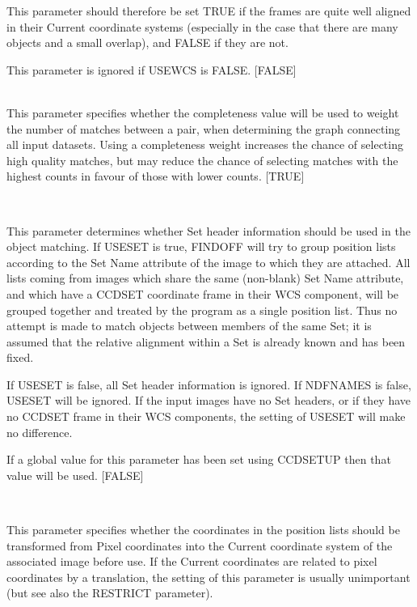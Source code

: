 \documentclass[twoside,11pt]{article}
\renewcommand{\_}{\texttt{\symbol{95}}}
\newcommand{\routine}[1]{{\sc #1}}
\newcommand{\sstsubsection}[1]{ \item[{#1}] \mbox{} \\}
\newcommand{\sstsubsection}[1]{\item[{#1}]}
\begin{document}
{{{         This parameter should therefore be set TRUE if the frames
         are quite well aligned in their Current coordinate systems
         (especially in the case that there are many objects and a
         small overlap), and FALSE if they are not.

         This parameter is ignored if USEWCS is FALSE.
         [FALSE]
      }
      \sstsubsection{
         USECOMP = \_LOGICAL (Read)
      } {
         This parameter specifies whether the completeness value will
         be used to weight the number of matches between a pair, when
         determining the graph connecting all input datasets. Using
         a completeness weight increases the chance of selecting high
         quality matches, but may reduce the chance of selecting matches
         with the highest counts in favour of those with lower counts.
         [TRUE]
      }
      \sstsubsection{
         USESET = \_LOGICAL (Read)
      } {
         This parameter determines whether Set header information should
         be used in the object matching.  If USESET is true, 
         \routine{FINDOFF} will try to group position lists according to
         the Set Name attribute of the image to which they are attached.
         All lists coming from images which share the same (non-blank)
         Set Name attribute, and which have a CCD\_SET coordinate frame 
         in their WCS component, will be grouped together and treated
         by the program as a single position list.  Thus no attempt
         is made to match objects between members of the same Set;
         it is assumed that the relative alignment within a Set 
         is already known and has been fixed.

         If USESET is false, all Set header information is ignored.
         If NDFNAMES is false, USESET will be ignored.  If the input 
         images have no Set headers, or if they have no CCD\_SET frame 
         in their WCS components, the setting of USESET will make
         no difference.

         If a global value for this parameter has been set using 
         CCDSETUP then that value will be used. 
         [FALSE]
      }
      \sstsubsection{
         USEWCS = \_LOGICAL (Read)
      } {
         This parameter specifies whether the coordinates in the
         position lists should be transformed from Pixel coordinates
         into the Current coordinate system of the associated image
         before use.
         If the Current coordinates are related to pixel coordinates
         by a translation, the setting of this parameter is usually
         unimportant (but see also the RESTRICT parameter).

}}}
\end{document}
